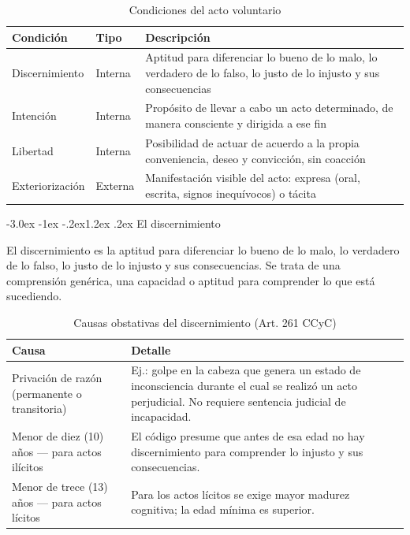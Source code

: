 \documentclass[12pt,oneside]{book}
\makeatletter
\renewcommand\section{\@startsection{section}{1}{\z@}%
  {-3.0ex \@plus -1ex \@minus -.2ex}{1.2ex \@plus .2ex}%
  {\normalfont\large\bfseries\color{acento}}}
\makeatother
\begin{document}
\begin{table}[H]
\centering
\caption{Condiciones del acto voluntario}
\begin{tabularx}{\textwidth}{l l X}
\toprule
\textbf{Condición} & \textbf{Tipo} & \textbf{Descripción} \\
\midrule
Discernimiento & Interna & Aptitud para diferenciar lo bueno de lo malo, lo verdadero de lo falso, lo justo de lo injusto y sus consecuencias \\
Intención & Interna & Propósito de llevar a cabo un acto determinado, de manera consciente y dirigida a ese fin \\
Libertad & Interna & Posibilidad de actuar de acuerdo a la propia conveniencia, deseo y convicción, sin coacción \\
Exteriorización & Externa & Manifestación visible del acto: expresa (oral, escrita, signos inequívocos) o tácita \\
\bottomrule
\end{tabularx}
\end{table}

\section{El discernimiento}

El discernimiento es la aptitud para diferenciar lo bueno de lo malo, lo verdadero de lo falso, lo justo de lo injusto y sus consecuencias. Se trata de una comprensión genérica, una capacidad o aptitud para comprender lo que está sucediendo.

\begin{table}[H]
\centering
\caption{Causas obstativas del discernimiento (Art. 261 CCyC)}
\begin{tabularx}{\textwidth}{l X}
\toprule
\textbf{Causa} & \textbf{Detalle} \\
\midrule
Privación de razón (permanente o transitoria) & Ej.: golpe en la cabeza que genera un estado de inconsciencia durante el cual se realizó un acto perjudicial. No requiere sentencia judicial de incapacidad. \\
Menor de diez (10) años --- para actos ilícitos & El código presume que antes de esa edad no hay discernimiento para comprender lo injusto y sus consecuencias. \\
Menor de trece (13) años --- para actos lícitos & Para los actos lícitos se exige mayor madurez cognitiva; la edad mínima es superior. \\
\bottomrule
\end{tabularx}
\end{table}
\end{document}
